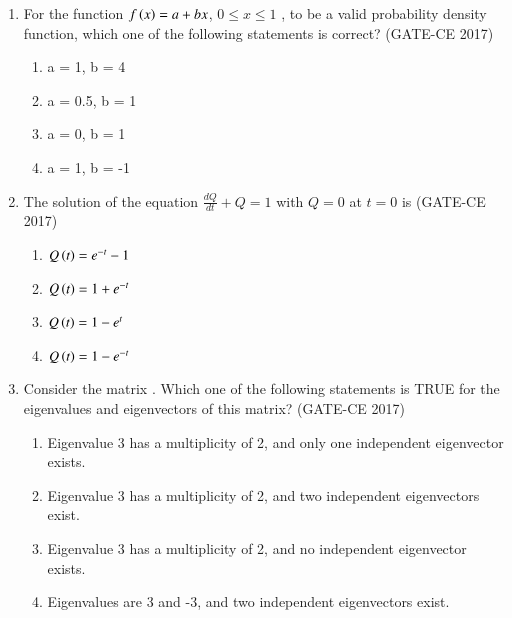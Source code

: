 \documentclass[journal,12pt,onecolumn]{article}
\theoremstyle{remark}
\begin{document}
\begin{enumerate}
    \item For the function $f\left(x\right) = a + bx $, $0 \leq x \leq 1$ , to be a valid probability density function, which one of the following statements is correct? \hfill (GATE-CE 2017)
    \begin{multicols}{2}
    \begin{enumerate}
        \item a = 1, b = 4
        \item a = 0.5, b = 1
        \item a = 0, b = 1
        \item a = 1, b = -1
    \end{enumerate}
    \end{multicols}

    \item The solution of the equation $\frac{dQ}{dt} + Q = 1$ with $Q = 0$ at $t = 0$ is \hfill (GATE-CE 2017)
    \begin{multicols}{2}
    \begin{enumerate}
        \item $Q\left(t\right) = e^{-t} - 1$
        \item $Q\left(t\right) = 1 + e^{-t}$
        \item $Q\left(t\right) = 1 - e^{t}$
        \item $Q\left(t\right) = 1 - e^{-t}$
    \end{enumerate}
    \end{multicols}

    \item Consider the matrix . Which one of the following statements is TRUE for the eigenvalues and eigenvectors of this matrix? \hfill (GATE-CE 2017)
    \begin{enumerate}
        \item Eigenvalue 3 has a multiplicity of 2, and only one independent eigenvector exists.
        \item Eigenvalue 3 has a multiplicity of 2, and two independent eigenvectors exist.
        \item Eigenvalue 3 has a multiplicity of 2, and no independent eigenvector exists.
        \item Eigenvalues are 3 and -3, and two independent eigenvectors exist.
    \end{enumerate}


\end{enumerate}
\end{document}
